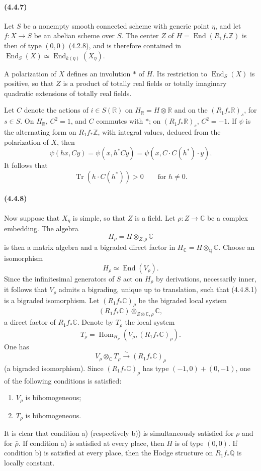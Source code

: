 \documentclass[10pt]{article}
\newcommand{\C}{\mathbb C}
\newcommand{\Q}{\mathbb Q}
\newcommand{\Z}{\mathbb Z}
\newcommand{\Hom}{\operatorname{Hom}}
\newcommand{\iso}{\xrightarrow{\sim}}
\newcommand{\R}{\mathbb R}
\providecommand{\End}{\operatorname{End}}
\newcommand{\Tr}{\operatorname{Tr}}
\begin{document}
\paragraph{(4.4.7)} Let $S$ be a nonempty smooth connected scheme with generic point $\eta$, and let $f:X\to S$ be an abelian scheme over $S$. The center $Z$ of $H=\End(R_1f_*\Z)$ is then of type $(0,0)$ (4.2.8), and is therefore contained in $\End_S(X)\simeq \End_{k(\eta)}(X_\eta)$.

A polarization of $X$ defines an involution $*$ of $H$. Its restriction to $\End_S(X)$ is positive, so that $Z$ is a product of totally real fields or totally imaginary quadratic extensions of totally real fields.

Let $C$ denote the actions of $i\in S(\R)$ on $H_\R=H\otimes\R$ and on the $(R_1f_*\R)_s$, for $s\in S$. On $H_\R$, $C^2=1$, and $C$ commutes with $*$; on $(R_1f_*\R)_s$, $C^2=-1$. If $\psi$ is the alternating form on $R_1f_*\Z$, with integral values, deduced from the polarization of $X$, then
\[
\psi(hx,Cy)=\psi(x,h^*Cy)=\psi(x,C\cdot C(h^*)\cdot y).
\]
It follows that
\[
\tag{4.4.7.1}
\Tr(h\cdot C(h^*))>0\qquad\text{for }h\ne0.
\]

\paragraph{(4.4.8)} Now suppose that $X_\eta$ is simple, so that $Z$ is a field. Let $\rho:Z\to\C$ be a complex embedding. The algebra
\[
H_\rho=H\otimes_{Z,\rho}\C
\]
is then a matrix algebra and a bigraded direct factor in $H_\C=H\otimes_\Q\C$. Choose an isomorphism
\[
\tag{4.4.8.1}
H_\rho\simeq\End(V_\rho).
\]
Since the infinitesimal generators of $S$ act on $H_\rho$ by derivations, necessarily inner, it follows that $V_\rho$ admits a bigrading, unique up to translation, such that (4.4.8.1) is a bigraded isomorphism. Let $(R_1f_*\C)_\rho$ be the bigraded local system
\[
(R_1f_*\C)\otimes_{Z\otimes\C,\rho}\C,
\]
a direct factor of $R_1f_*\C$. Denote by $T_\rho$ the local system
\[
T_\rho=\Hom_{H_\rho}(V_\rho,(R_1f_*\C)_\rho).
\]
One has
\[
\tag{4.4.8.2}
V_\rho\otimes_\C T_\rho\iso (R_1f_*\C)_\rho
\]
(a bigraded isomorphism). Since $(R_1f_*\C)_\rho$ has type $(-1,0)+(0,-1)$, one of the following conditions is satisfied:
\begin{enumerate}[label=\alph*)]
\item $V_\rho$ is bihomogeneous;
\item $T_\rho$ is bihomogeneous.
\end{enumerate}
It is clear that condition a) (respectively b)) is simultaneously satisfied for $\rho$ and for $\bar\rho$. If condition a) is satisfied at every place, then $H$ is of type $(0,0)$. If condition b) is satisfied at every place, then the Hodge structure on $R_1f_*\Q$ is locally constant.
\end{document}
